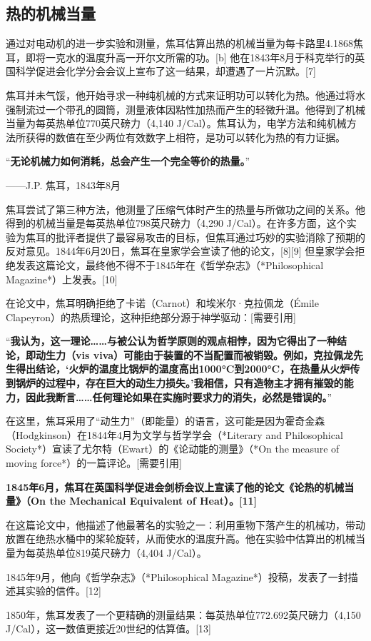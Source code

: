 \subsection{热的机械当量}  
通过对电动机的进一步实验和测量，焦耳估算出热的机械当量为每卡路里4.1868焦耳，即将一克水的温度升高一开尔文所需的功。[b] 他在1843年8月于科克举行的英国科学促进会化学分会会议上宣布了这一结果，却遭遇了一片沉默。[7]  

焦耳并未气馁，他开始寻求一种纯机械的方式来证明功可以转化为热。他通过将水强制流过一个带孔的圆筒，测量液体因粘性加热而产生的轻微升温。他得到了机械当量为每英热单位770英尺磅力（4,140 J/Cal）。焦耳认为，电学方法和纯机械方法所获得的数值在至少两位有效数字上相符，是功可以转化为热的有力证据。  

“\textbf{无论机械力如何消耗，总会产生一个完全等价的热量。}”

——J.P. 焦耳，1843年8月  

焦耳尝试了第三种方法，他测量了压缩气体时产生的热量与所做功之间的关系。他得到的机械当量是每英热单位798英尺磅力（4,290 J/Cal）。在许多方面，这个实验为焦耳的批评者提供了最容易攻击的目标，但焦耳通过巧妙的实验消除了预期的反对意见。1844年6月20日，焦耳在皇家学会宣读了他的论文，[8][9] 但皇家学会拒绝发表这篇论文，最终他不得不于1845年在《哲学杂志》（*Philosophical Magazine*）上发表。[10]  

在论文中，焦耳明确拒绝了卡诺（Carnot）和埃米尔·克拉佩龙（Émile Clapeyron）的热质理论，这种拒绝部分源于神学驱动：[需要引用]  

“\textbf{我认为，这一理论……与被公认为哲学原则的观点相悖，因为它得出了一种结论，即动生力（vis viva）可能由于装置的不当配置而被销毁。例如，克拉佩龙先生得出结论，‘火炉的温度比锅炉的温度高出1000°C到2000°C，在热量从火炉传到锅炉的过程中，存在巨大的动生力损失。’我相信，只有造物主才拥有摧毁的能力，因此我断言……任何理论如果在实施时要求力的消失，必然是错误的。}”

在这里，焦耳采用了“动生力”（即能量）的语言，这可能是因为霍奇金森（Hodgkinson）在1844年4月为文学与哲学学会（*Literary and Philosophical Society*）宣读了尤尔特（Ewart）的《论动能的测量》（*On the measure of moving force*）的一篇评论。[需要引用]  

\textbf{1845年6月，焦耳在英国科学促进会剑桥会议上宣读了他的论文《论热的机械当量》（On the Mechanical Equivalent of Heat）。[11] }

在这篇论文中，他描述了他最著名的实验之一：利用重物下落产生的机械功，带动放置在绝热水桶中的桨轮旋转，从而使水的温度升高。他在实验中估算出的机械当量为每英热单位819英尺磅力（4,404 J/Cal）。  

1845年9月，他向《哲学杂志》（*Philosophical Magazine*）投稿，发表了一封描述其实验的信件。[12]  

1850年，焦耳发表了一个更精确的测量结果：每英热单位772.692英尺磅力（4,150 J/Cal），这一数值更接近20世纪的估算值。[13]

